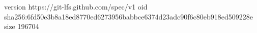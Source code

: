 version https://git-lfs.github.com/spec/v1
oid sha256:6fd50e3b8a18ed8770ed6273956babbce6374d23adc90f6c80eb918ed509228e
size 196704
